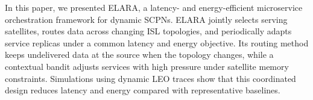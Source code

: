 \documentclass[10pt, conference, letterpaper]{IEEEtran}
\begin{document}
In this paper, we  presented ELARA, a latency- and energy-efficient microservice orchestration framework for dynamic SCPNs. ELARA jointly selects serving satellites, routes data across changing ISL topologies, and periodically adapts service replicas under a common latency and energy objective. Its routing method keeps undelivered data at the source when the topology changes, while a contextual bandit adjusts services with high pressure under satellite memory constraints. Simulations using dynamic LEO traces show that this coordinated design reduces latency and energy compared with representative baselines.




%



\end{document}
